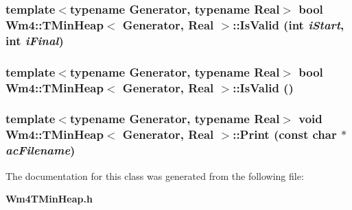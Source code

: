 \subsubsection{\setlength{\rightskip}{0pt plus 5cm}template$<$typename Generator, typename Real$>$ bool {\bf Wm4::TMin\-Heap}$<$ Generator, Real $>$::Is\-Valid (int {\em i\-Start}, int {\em i\-Final})}\label{classWm4_1_1TMinHeap_863d96ae63aa0b31107003020369d59e}


\subsubsection{\setlength{\rightskip}{0pt plus 5cm}template$<$typename Generator, typename Real$>$ bool {\bf Wm4::TMin\-Heap}$<$ Generator, Real $>$::Is\-Valid ()}\label{classWm4_1_1TMinHeap_12ff2bf9c90595ada66e867778363c04}


\subsubsection{\setlength{\rightskip}{0pt plus 5cm}template$<$typename Generator, typename Real$>$ void {\bf Wm4::TMin\-Heap}$<$ Generator, Real $>$::Print (const char $\ast$ {\em ac\-Filename})}\label{classWm4_1_1TMinHeap_b9b32cd5d9d56d4fc7c24ccb8317a013}




The documentation for this class was generated from the following file:\begin{CompactItemize}
\item 
{\bf Wm4TMin\-Heap.h}\end{CompactItemize}

